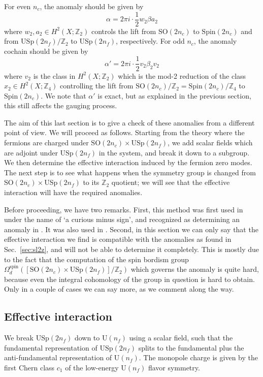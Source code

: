 \documentclass[12pt]{article}
\numberwithin{equation}{section}
\def\bZ{\mathbb{Z}}
\def\U{\mathrm{U}}
\def\SO{\mathrm{SO}}
\def\USp{\mathrm{USp}}
\def\Spin{\mathrm{Spin}}
\begin{document}
For even $n_c$, the anomaly should be given by  \begin{equation}
\alpha= 2\pi i \cdot \frac12 w_2 \beta a_2
\end{equation}
where $w_2,a_2\in H^2(X;\bZ_2)$ controls the lift from $\SO(2n_c)$ to $\Spin(2n_c)$
and from $\USp(2n_f)/\bZ_2$ to $\USp(2n_f)$, respectively.
For odd $n_c$, the anomaly cochain should be given by 
 \begin{equation}
\alpha'=2\pi i \cdot \frac12 v_2 \beta_2 v_2
\end{equation} where $v_2$ is the class in $H^2(X;\bZ_2)$ which is the mod-2 reduction of
the class $x_2 \in H^2(X;\bZ_4)$ controlling the lift from $\SO(2n_c)/\bZ_2=\Spin(2n_c)/\bZ_4$ to $\Spin(2n_c)$.
We note that $\alpha'$ is exact, but as explained in the previous section, this still affects the gauging process.


The aim of this last section is to give a check of these anomalies from a different point of view.
We will proceed as follows. 
Starting from the theory where the fermions are charged under $\SO(2n_c)\times \USp(2n_f)$,
we add scalar fields which are adjoint under $\USp(2n_f)$ in the system, and break it down to a subgroup.
We then determine the effective interaction induced by the fermion zero modes.
The next step is to see what happens when the symmetry group is changed from $\SO(2n_c)\times \USp(2n_f)$ to its $\bZ_2$ quotient;
we will see that the effective interaction will have the required anomalies.

Before proceeding, we have two remarks.
First, this method was first used in \cite[Sec.~4]{Witten:1995gf} under the name of `a curious minus sign', and recognized as determining an anomaly in \cite[Sec.~2.4.3]{Cordova:2018acb}.
It was also used in \cite[Sec.~3.1 and Sec.~5.1.2]{Wang:2018qoy}.
Second, in this section we can only say that the effective interaction we find is compatible with the anomalies
as found in Sec.~\ref{sec:sl2z},
and will not be able to determine it completely.
This is mostly due to the fact that the computation of the spin bordism group $\Omega^\text{spin}_d([\SO(2n_c)\times \USp(2n_f)]/\bZ_2)$ which governs the anomaly is quite hard, 
because even the integral cohomology of the group in question is hard to obtain.
Only in a couple of cases we can say more, as we comment along the way.

\subsection{Effective interaction}
We break $\USp(2n_f)$ down to $\U(n_f)$ using a scalar field,
such that the fundamental representation of $\USp(2n_f)$ splits to the fundamental plus the anti-fundamental representation of $\U(n_f)$.
The monopole charge is given by the first Chern class $c_1$ of the low-energy $\U(n_f)$ flavor symmetry.
\end{document}
